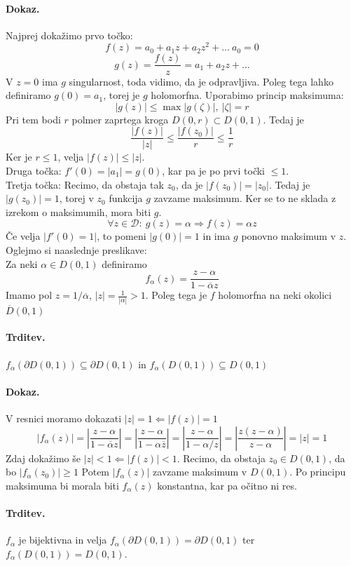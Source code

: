 \documentclass[a4paper]{article}
\begin{document}
\paragraph{Dokaz.} Najprej dokažimo prvo točko: $$f(z) = a_0 + a_1z + a_2z^2 + ... ~a_0 = 0$$
$$g(z) = \frac{f(z)}{z} = a_1 + a_2z + ...$$
V $z=0$ ima $g$ singularnost, toda vidimo, da je odpravljiva. Poleg tega lahko definiramo $g(0) = a_1$, torej je $g$ holomorfna.
Uporabimo princip maksimuma:
$$|g(z)| \leq \max|g(\zeta)|,~|\zeta|=r$$
Pri tem bodi $r$ polmer zaprtega kroga $D(0, r) \subset D(0, 1)$.
Tedaj je $$\frac{|f(z)|}{|z|} \leq \frac{|f(z_0)|}{r} \leq \frac{1}{r}$$
Ker je $r \leq 1$, velja $|f(z)| \leq |z|$. \\
Druga točka: $f'(0) = |a_1| = g(0)$, kar pa je po prvi točki $\leq 1$. \\
Tretja točka: Recimo, da obstaja tak $z_0$, da je $|f(z_0)| = |z_0|$. Tedaj je $|g(z_0)|=1$, torej v $z_0$ funkcija $g$ zavzame maksimum. Ker se to ne sklada z izrekom o maksimumih, mora biti $g$.
$$\forall z \in \mathcal{D}:~g(z) = \alpha\Rightarrow f(z) = \alpha z$$
Če velja $|f'(0) = 1|$, to pomeni $|g(0)|=1$ in ima $g$ ponovno maksimum v $z$. \\[4mm]
Oglejmo si naaslednje preslikave: \\
Za neki $\alpha \in D(0, 1)$ definiramo 
$$f_\alpha(z) = \frac{z-\alpha}{1-\overline{\alpha}z}$$
Imamo pol $z=1/\overline{\alpha}$, $|z| = \frac{1}{|\alpha|} > 1$. Poleg tega je $f$ holomorfna na neki okolici $\overline{D}(0, 1)$
\paragraph{Trditev.} $f_\alpha(\partial D(0, 1)) \subseteq \partial D(0, 1)$ in $f_\alpha(D(0, 1)) \subseteq D(0, 1)$
\paragraph{Dokaz.} V resnici moramo dokazati $|z|=1 \Leftarrow |f(z)| = 1$
$$\left|f_\alpha(z)\right| = \left|\frac{z-\alpha}{1-\overline{\alpha}z}\right| = \left|\frac{z-\alpha}{1-\alpha\overline{z}}\right| = \left|\frac{z-\alpha}{1-\alpha/z}\right| = \left|\frac{z(z-\alpha)}{z-\alpha}\right| = |z| = 1$$
Zdaj dokažimo še $|z|<1\Leftarrow|f(z)|<1$. Recimo, da obstaja $z_0\in D(0, 1)$, da bo $|f_\alpha(z_0)| \geq 1$
Potem $|f_\alpha(z)|$ zavzame maksimum v $D(0, 1)$. Po principu maksimuma bi morala biti $f_\alpha(z)$ konstantna, kar pa očitno ni res.
\paragraph{Trditev.} $f_\alpha$ je bijektivna in velja $f_\alpha(\partial D(0, 1)) = \partial D(0, 1)$ ter $f_\alpha(D(0, 1)) = D(0, 1)$.
\end{document}
